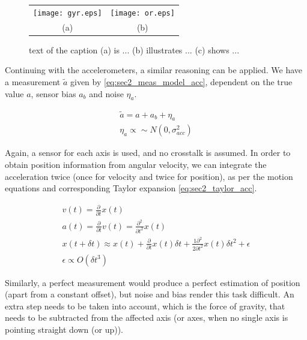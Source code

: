 \documentclass[10pt,twocolumn]{IEEEtran}
\begin{document}
\begin{figure}[ht]
    \label{fig:sec2_gyr_noise_int}
	\centering
		\begin{tabular}{cc}
		   \texttt{[image: gyr.eps]} &
		   \texttt{[image: or.eps]} \\
		   (a) & (b) \\
		\end{tabular}
	\caption{text of the caption (a) is ... (b) illustrates ... (c) shows ...}
\end{figure}

Continuing with the accelerometers, a similar reasoning can be applied. We have a measurement $\tilde{a}$ given by \eqref{eq:sec2_meas_model_acc}, dependent on the true value $a$, sensor bias $a_b$ and noise $\eta_a$.

\begin{equation}
    \label{eq:sec2_meas_model_acc}
    \begin{split}
        \tilde{a} = a + a_b + \eta_a \\
        \eta_a \propto \sim N\left( 0, \sigma_{acc}^2 \right)
    \end{split}
\end{equation}

Again, a sensor for each axis is used, and no crosstalk is assumed. In order to obtain position information from angular velocity, we can integrate the acceleration twice (once for velocity and twice for position), as per the motion equations and corresponding Taylor expansion \eqref{eq:sec2_taylor_acc}.

\begin{equation}
    \label{eq:sec2_taylor_acc}
    \begin{split}
        v(t) = \frac{\partial}{\partial t} x(t) \\
        a(t) = \frac{\partial}{\partial t} v(t) = \frac{\partial^2}{\partial t^2} x(t)\\
        x(t+\delta t) \approx x(t) + \frac{\partial}{\partial t} x(t) \delta t + \frac{1 \partial^2}{2 \partial t^2} x(t) \delta t^2+ \epsilon\\
        \epsilon \propto O(\delta t^3)
    \end{split}
\end{equation}

Similarly, a perfect measurement would produce a perfect estimation of position (apart from a constant offset), but noise and bias render this task difficult. An extra step needs to be taken into account, which is the force of gravity, that needs to be subtracted from the affected axis (or axes, when no single axis is pointing straight down (or up)).
\end{document}
